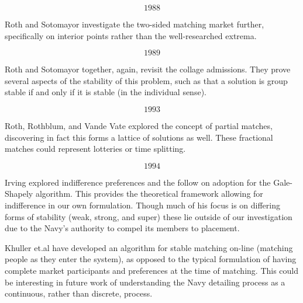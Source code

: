 \[1988\]

Roth and Sotomayor investigate the two-sided matching market further, specifically on interior points rather than the well-researched extrema. \citep{1988_Roth_Sotomayor}

\[1989\]

Roth and Sotomayor together, again, revisit the collage admissions. \citep{1989_Roth} They prove several aspects of the stability of this problem, such as that a solution is group stable if and only if it is stable (in the individual sense).


\[1993\]

Roth, Rothblum, and Vande Vate explored the concept of partial matches, discovering in fact this forms a lattice of solutions as well. These fractional matches could represent lotteries or time splitting. \citep{1993_Roth}

\[1994\]

Irving explored indifference preferences and the follow on adoption for the Gale-Shapely algorithm. \citep{1994_Irving} This provides the theoretical framework allowing for indifference in our own formulation. Though much of his focus is on differing forms of stability (weak, strong, and super) these lie outside of our investigation due to the Navy's authority to compel its members to placement.


Khuller et.al have developed an algorithm for stable matching on-line (matching people as they enter the system), as opposed to the typical formulation of having complete market participants and preferences at the time of matching. \citep{1994_Khuller} This could be interesting in future work of understanding the Navy detailing process as a continuous, rather than discrete, process.

